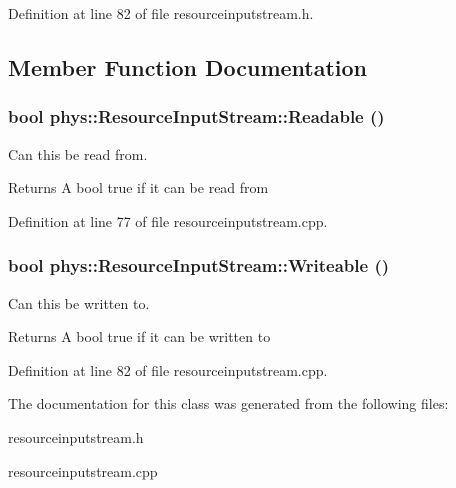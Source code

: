 Definition at line 82 of file resourceinputstream.h.



\subsection{Member Function Documentation}
\hypertarget{classphys_1_1ResourceInputStream_a4900f77dd452c2a2ddf47a76d36d85c3}{
\subsubsection[{Readable}]{\setlength{\rightskip}{0pt plus 5cm}bool phys::ResourceInputStream::Readable ()}}
\label{dc/d52/classphys_1_1ResourceInputStream_a4900f77dd452c2a2ddf47a76d36d85c3}


Can this be read from. 

\begin{DoxyReturn}{Returns}
A bool true if it can be read from 
\end{DoxyReturn}


Definition at line 77 of file resourceinputstream.cpp.

\hypertarget{classphys_1_1ResourceInputStream_a6e7619bf3efd3b344fab92d326385009}{
\subsubsection[{Writeable}]{\setlength{\rightskip}{0pt plus 5cm}bool phys::ResourceInputStream::Writeable ()}}
\label{dc/d52/classphys_1_1ResourceInputStream_a6e7619bf3efd3b344fab92d326385009}


Can this be written to. 

\begin{DoxyReturn}{Returns}
A bool true if it can be written to 
\end{DoxyReturn}


Definition at line 82 of file resourceinputstream.cpp.



The documentation for this class was generated from the following files:\begin{DoxyCompactItemize}
\item 
resourceinputstream.h\item 
resourceinputstream.cpp\end{DoxyCompactItemize}
